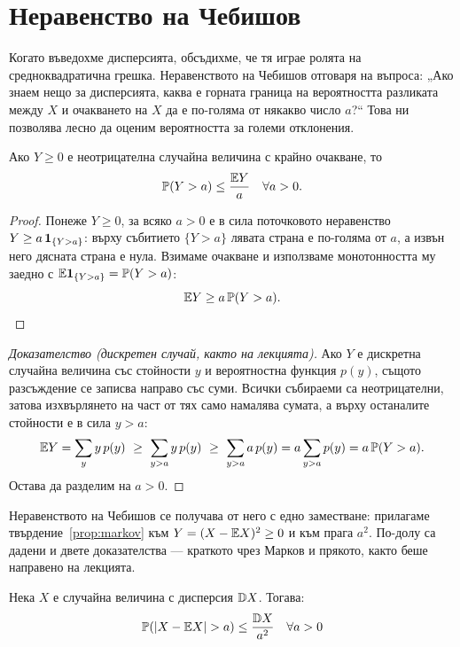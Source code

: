 \section{Неравенство на Чебишов}

Когато въведохме дисперсията, обсъдихме, че тя играе ролята на средноквадратична грешка. Неравенството на Чебишов отговаря на въпроса: „Ако знаем нещо за дисперсията, каква е горната граница на вероятността разликата между $X$ и очакването на $X$ да е по-голяма от някакво число $a$?“ Това ни позволява лесно да оценим вероятността за големи отклонения.

\begin{prop}\label{prop:markov}
Ако $Y \ge 0$ е неотрицателна случайна величина с крайно очакване, то
\[ \mathbb{P}(Y > a) \le \frac{\mathbb{E} Y}{a} \quad \forall a > 0 . \]
\end{prop}

\begin{proof}
Понеже $Y \ge 0$, за всяко $a>0$ е в сила поточковото неравенство
$Y \ge a\,\mathbf{1}_{\{Y > a\}}$: върху събитието $\{Y>a\}$ лявата страна е по-голяма от $a$, а
извън него дясната страна е нула. Взимаме очакване и използваме монотонността му заедно с
$\mathbb{E} \mathbf{1}_{\{Y>a\}} = \mathbb{P}(Y>a)$:
\[ \mathbb{E} Y \ge a\,\mathbb{P}(Y > a) . \]
\end{proof}

\begin{proof}[Доказателство (дискретен случай, както на лекцията)]
Ако $Y$ е дискретна случайна величина със стойности $y$ и вероятностна функция $p(y)$,
същото разсъждение се записва направо със суми. Всички събираеми са неотрицателни,
затова изхвърлянето на част от тях само намалява сумата, а върху останалите стойности
е в сила $y > a$:
\[
\mathbb{E} Y = \sum_{y} y\,p(y) \ \ge\ \sum_{y > a} y\,p(y) \ \ge\ \sum_{y > a} a\,p(y)
= a \sum_{y > a} p(y) = a\,\mathbb{P}(Y > a) .
\]
Остава да разделим на $a > 0$.
\end{proof}

Неравенството на Чебишов се получава от него с едно заместване: прилагаме
твърдение~\ref{prop:markov} към $Y = (X - \mathbb{E} X)^2 \ge 0$ и към прага $a^2$. По-долу са
дадени и двете доказателства — краткото чрез Марков и прякото, както беше
направено на лекцията.

\begin{keythm}
Нека $X$ е случайна величина с дисперсия $\mathbb{D} X$. Тогава:
\[
\mathbb{P}(|X - \mathbb{E} X| > a) \le \frac{\mathbb{D} X}{a^2} \quad \forall a > 0
\]
\end{keythm}

